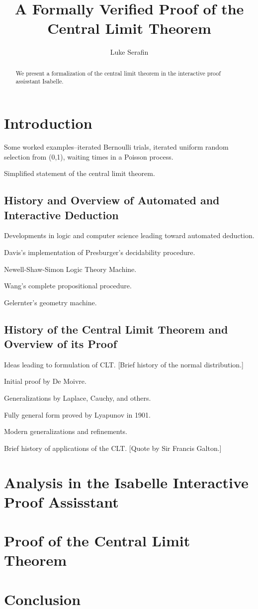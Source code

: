 \documentclass{amsart}
\title{A Formally Verified Proof of the Central Limit Theorem}
\author{Luke Serafin}
\theoremstyle{definition}
\theoremstyle{remark}
\begin{document}
\begin{abstract}
We present a formalization of the central limit theorem in the interactive proof assisstant Isabelle.
\end{abstract}

\maketitle

\section{Introduction}

Some worked examples--iterated Bernoulli trials, iterated uniform random selection from (0,1), waiting times in a Poisson process.

Simplified statement of the central limit theorem.

\subsection{History and Overview of Automated and Interactive Deduction}

Developments in logic and computer science leading toward automated deduction.

Davis's implementation of Presburger's decidability procedure.

Newell-Shaw-Simon Logic Theory Machine.

Wang's complete propositional procedure.

Gelernter's geometry machine.

\subsection{History of the Central Limit Theorem and Overview of its Proof}

Ideas leading to formulation of CLT. [Brief history of the normal distribution.]

Initial proof by De Moivre.

Generalizations by Laplace, Cauchy, and others.

Fully general form proved by Lyapunov in 1901.

Modern generalizations and refinements.

Brief history of applications of the CLT. [Quote by Sir Francis Galton.]

\section{Analysis in the Isabelle Interactive Proof Assisstant}



\section{Proof of the Central Limit Theorem}



\section{Conclusion}





\end{document}
